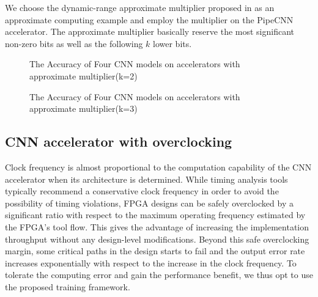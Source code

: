 We choose the dynamic-range approximate multiplier proposed in \cite{Approximate_Multiplier_31} as 
an approximate computing example and employ the multiplier on the PipeCNN
accelerator. The approximate multiplier basically reserve the most 
significant non-zero bits as well as the following $k$ lower bits. 

\begin{figure}
        \center
        \qquad
        \caption{The Accuracy of Four CNN models on accelerators with approximate multiplier(k=2)}
        \label{fig:approximate mltiplier}
\end{figure}

\begin{figure}
        \center
        \qquad
        \caption{The Accuracy of Four CNN models on accelerators with approximate multiplier(k=3)}
        \label{fig:approximate mltiplier}
\end{figure}

\subsection{CNN accelerator with overclocking}
  Clock frequency is almost proportional to the computation capability of the CNN accelerator 
when its architecture is determined. While timing analysis tools typically recommend a 
conservative clock frequency in order to avoid the possibility of timing violations, 
FPGA designs can be safely overclocked by a significant ratio with respect to the maximum 
operating frequency estimated by the FPGA’s tool flow. This gives the advantage of increasing 
the implementation throughput without any design-level modifications. Beyond this safe overclocking 
margin, some critical paths in the design starts to fail and the output error rate increases 
exponentially with respect to the increase in the clock frequency. To tolerate the computing 
error and gain the performance benefit, we thus opt to use the proposed training framework.  

